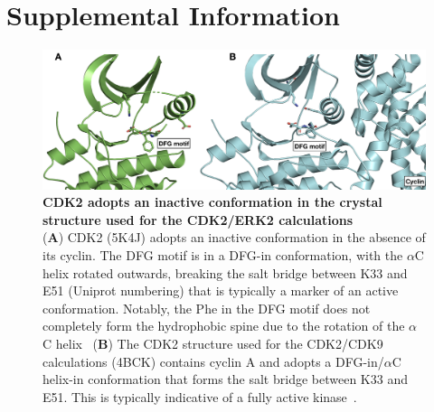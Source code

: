 \documentclass[9pt,lineno]{elife-modified} %
\begin{document}
%
%
\newpage
%
%





%
%
%
%
%
%
\newpage
\section{Supplemental Information}
\setcounter{figure}{0} 
\renewcommand{\figurename}{Supplemental Figure.}

\begin{figure}[h]
\begin{fullwidth}
\begin{centering}
\includegraphics[width=1.0\linewidth]{figures/supp_figure1.png}
\end{centering}
\caption{
\label{fig:sup-figure-1}
{\bf CDK2 adopts an inactive conformation in the crystal structure used for the CDK2/ERK2 calculations} \\
({\bf A}) CDK2 (5K4J) adopts an inactive conformation in the absence of its cyclin. The DFG motif is in a DFG-in conformation, with the $\alpha$C helix rotated outwards, breaking the salt bridge between K33 and E51 (Uniprot numbering) that is typically a marker of an active conformation. Notably, the Phe in the DFG motif does not completely form the hydrophobic spine due to the rotation of the $\alpha$C helix~\citep{Hu:2015kh}
({\bf B}) The CDK2 structure used for the CDK2/CDK9 calculations (4BCK) contains cyclin A and adopts a DFG-in/$\alpha$C helix-in conformation that forms the salt bridge between K33 and E51. This is typically indicative of a fully active kinase~\citep{Huse2002-ml,Hari:2013dp}. 
}
\end{fullwidth}
\end{figure}
\end{document}
